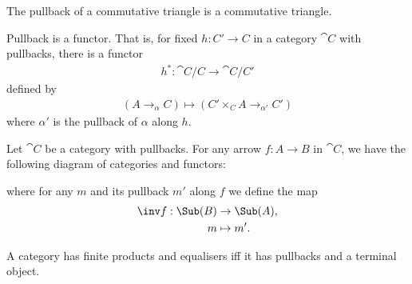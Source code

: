 \documentclass{article}
\begin{document}
\begin{corollary}[Awodey p. 96]
    The pullback of a commutative triangle is a commutative triangle.

    \begin{center}
    \end{center}
\end{corollary}

\begin{proposition}
    Pullback is a functor. That is, for fixed $h:C'\to C$ in a category $\cat C$ with pullbacks,
    there is a functor
    \begin{align*}
        h^*:\cat C/C \to \cat C/C'
    \end{align*}
    defined by
    \begin{align*}
        (A\to_\alpha C)\mapsto (C'\times_C A\to_{\alpha'}C')
    \end{align*}
    where $\alpha'$ is the pullback of $\alpha$ along $h$.
\end{proposition}

\begin{corollary}[Awodey p. 97]
    Let $\cat C$ be a category with pullbacks. For any arrow $f:A\to B$
    in $\cat C$, we have the following diagram of categories and functors:
    \begin{center}
    \end{center}
    where for any $m$ and its pullback $m'$ along $f$ we define
    the map
    \begin{align*}
        \inv f: \Sub(B)&\to\Sub(A),\\
        m &\mapsto m'.
    \end{align*}
\end{corollary}

\begin{proposition}
    A category has finite products and equalisers iff it has pullbacks and a
    terminal object.
\end{proposition} 
\end{document}
